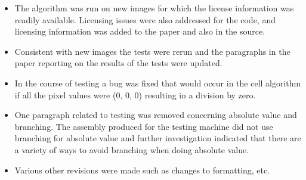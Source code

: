 \documentclass[twocolumn]{article}
\begin{document}
\begin{itemize}

\item The algorithm was run on new images for which the license information
  was readily available. Licensing issues were also addressed for the code,
  and licensing information was added to the paper and also in the source.

\item Consistent with new images the tests were rerun and the paragraphs in
  the paper reporting on the results of the tests were updated. 

\item In the course of testing a bug was fixed that would occur in the cell
  algorithm if all the pixel values were (0, 0, 0) resulting in a division by
  zero.

\item One paragraph related to testing was removed concerning absolute value
  and branching. The assembly produced for the testing machine did not use
  branching for absolute value and further investigation indicated that there
  are a variety of ways to avoid branching when doing absolute value. 

\item Various other revisions were made such as changes to formatting, etc.

\end{itemize}

\nocite{fusion2}
\nocite{fusion3}



\end{document}
